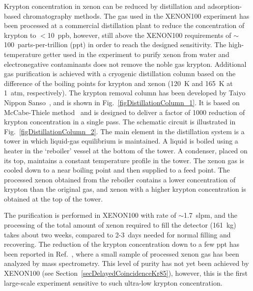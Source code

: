 Krypton concentration in xenon can be reduced by distillation and adsorption-based chromatography methods. 
The gas used in the XENON100 experiment has been processed at a commercial distillation plant to reduce the concentration of krypton to $<$10~ppb, however, still above the XENON100 requirements of $\sim$100~parts-per-trillion (ppt) in order to reach the designed sensitivity.
The high-temperature getter used in the experiment to purify xenon from water and electronegative contaminants does not remove the noble gas krypton. Additional gas purification is achieved with a cryogenic distillation column based on the difference of the boiling points for krypton and xenon (120~K and 165~K at 1~atm, respectively). The krypton removal column has been developed by Taiyo Nippon Sanso~\cite{NipponSanso}, and is shown in Fig.~\ref{figDistillationColumn_1}. It is based on McCabe-Thiele method~\cite{McCabe} and is designed to deliver a factor of 1000 reduction of krypton concentration in a single pass. The schematic circuit is illustrated in Fig.~\ref{figDistillationColumn_2}. The main element in the distillation system is a tower in which liquid-gas equilibrium is maintained. A liquid is boiled using a heater in the `reboiler' vessel at the bottom of the tower. A condenser, placed on its top, maintains a constant temperature profile in the tower. The xenon gas is cooled down to a near boiling point and then supplied to a feed point. The processed xenon obtained from the reboiler contains a lower concentration of krypton than the original gas, and xenon with a higher krypton concentration is obtained at the top of the tower. 

The purification is performed in XENON100 with rate of $\sim$1.7~slpm, and the processing of the total amount of xenon required to fill the detector (161~kg) takes about two weeks, compared to 2-3~days needed for normal filling and recovering. The reduction of the krypton concentration down to a few ppt has been reported in Ref.~\cite{DistillationColumn}, where a small sample of processed xenon gas has been analyzed by mass spectrometry. This level of purity has not yet been achieved by XENON100 (see Section~\ref{secDelayedCoincidenceKr85}), however, this is the first large-scale experiment sensitive to such ultra-low krypton concentration.

